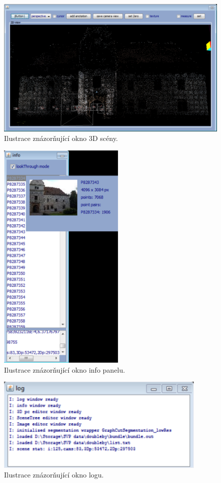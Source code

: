 \documentclass[11pt,twoside,a4paper]{book}
\begin{document}
\begin{figure}[]
	\begin{center}
		\includegraphics[width=13cm]{ilustrace/Il-1-3}
		\caption{Ilustrace znázorňující okno 3D scény.}
		\label{fig:1-3}
	\end{center}
\end{figure}

\begin{figure}[]
	\begin{center}
		\includegraphics[width=6cm]{ilustrace/Il-1-4}
		\caption{Ilustrace znázorňující okno info panelu.}
		\label{fig:1-4}
	\end{center}
\end{figure}

\begin{figure}[]
	\begin{center}
		\includegraphics[width=10cm]{ilustrace/Il-1-5}
		\caption{Ilustrace znázorňující okno logu.}
		\label{fig:1-5}
	\end{center}
\end{figure}
\end{document}
